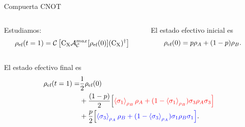 \begin{frame}{Compuerta CNOT}
    \begin{columns}
        \begin{column}{0.5\textwidth}
            Estudiamos:
            \begin{equation}
                \rho_{\text{ef}}(t=1)=\mathcal{C}\left[\text{C}_{\text{X}} \mathcal{A}_{\mathcal{C}}^{max}[\rho_{\text{ef}}(0)](\text{C}_{\text{X}})^{\dag}\right]\nonumber
            \end{equation}
        \end{column}\pause
        \begin{column}{0.5\textwidth}
            El estado efectivo inicial es
            \begin{equation}
                \rho_{\text{ef}}(0)=p\rho_{A}+(1-p)\rho_{B}.\nonumber
            \end{equation}
        \end{column}\pause
    \end{columns}
    El estado efectivo final es\pause
    \begin{align*}
        \rho_{\text{ef}}(t=1)=&\frac{1}{2}\rho_{\text{ef}}(0)\\
        &+\frac{(1-p)}{2}\qty[{\color{red}\expval{\sigma_{1}}_{\rho_{B}}\rho_{A}+(1-\expval{\sigma_{1}}_{\rho_{B}})\sigma_{3}\rho_{A}\sigma_{3}}]\\
        &+\frac{p}{2}\qty[{\color{blue}\expval{\sigma_{3}}_{\rho_{A}}\rho_{B}+(1-\expval{\sigma_{3}}_{\rho_{A}})\sigma_{1}\rho_{B}\sigma_{1}}].
    \end{align*}\pause
\end{frame}
